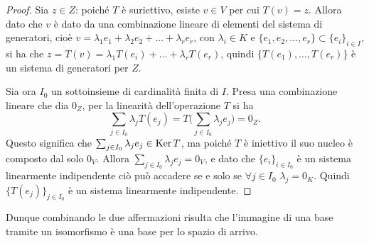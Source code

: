 \begin{proof}
	Sia $  z\in Z$: poiché $T$ è suriettivo, esiste $  v\in V$ per cui $T(  v)=  z$.
	Allora dato che $  v$ è dato da una combinazione lineare di elementi del sistema di generatori, cioè $  v=\lambda_1  e_1+\lambda_2  e_2+\dots+\lambda_r  e_r$, con $\lambda_i\in K$ e $\{  e_1,  e_2,\dots,  e_r\}\subset\{  e_i\}_{i\in I}$, si ha che $  z=T(  v)=\lambda_1T(  e_i)+\dots+\lambda_rT(  e_r)$, quindi $\{T(  e_1),\dots,T(  e_r)\}$ è un sistema di generatori per $Z$.

	Sia ora $I_0$ un sottoinsieme di cardinalità finita di $I$.
	Presa una combinazione lineare che dia $0_Z$, per la linearità dell'operazione $T$ si ha
	\begin{equation*}
		\sum_{j\in I_0}\lambda_jT(  e_j)=T\big(\sum_{j\in I_0}\lambda_j  e_j\big)=0_Z.
	\end{equation*}
	Questo significa che $\sum_{j\in I_0}\lambda_j  e_j\in\operatorname{Ker} T$, ma poiché $T$ è iniettivo il suo nucleo è composto dal solo $0_V$.
	Allora $\sum_{j\in I_0}\lambda_j  e_j=0_V$, e dato che $\{  e_i\}_{i\in I_0}$ è un sistema linearmente indipendente ciò può accadere se e solo se $\forall j\in I_0$ $\lambda_j=0_K$. Quindi $\{T(  e_j)\}_{j\in I_0}$ è un sistema linearmente indipendente.
\end{proof}
Dunque combinando le due affermazioni risulta che l'immagine di una base tramite un isomorfismo è una base per lo spazio di arrivo.

